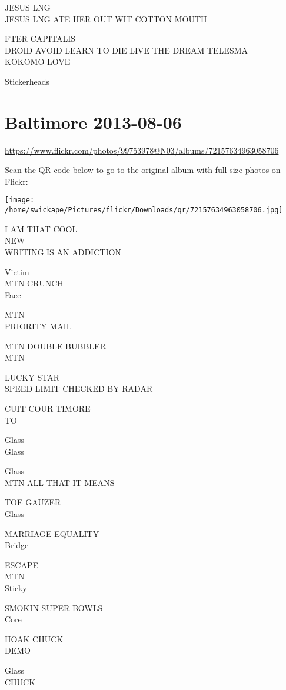 \documentclass[10pt,letterpaper]{article}
\begin{document}
JESUS LNG\\
JESUS LNG ATE HER OUT WIT COTTON MOUTH

FTER CAPITALIS\\
DROID AVOID LEARN TO DIE LIVE THE DREAM TELESMA\\
KOKOMO LOVE

Stickerheads


\section*{Baltimore 2013-08-06}

\url{https://www.flickr.com/photos/99753978@N03/albums/72157634963058706}

Scan the QR code below to go to the original album with full-size photos on Flickr:

\texttt{[image: /home/swickape/Pictures/flickr/Downloads/qr/72157634963058706.jpg]}


I AM THAT COOL\\
NEW\\
WRITING IS AN ADDICTION

Victim\\
MTN CRUNCH\\
Face

MTN\\
PRIORITY MAIL

MTN DOUBLE BUBBLER\\
MTN

LUCKY STAR\\
SPEED LIMIT CHECKED BY RADAR

CUIT COUR TIMORE\\
TO

Glass\\
Glass

Glass\\
MTN ALL THAT IT MEANS

TOE GAUZER\\
Glass

MARRIAGE EQUALITY\\
Bridge

ESCAPE\\
MTN\\
Sticky

SMOKIN SUPER BOWLS\\
Core

HOAK CHUCK\\
DEMO

Glass\\
CHUCK
\end{document}
